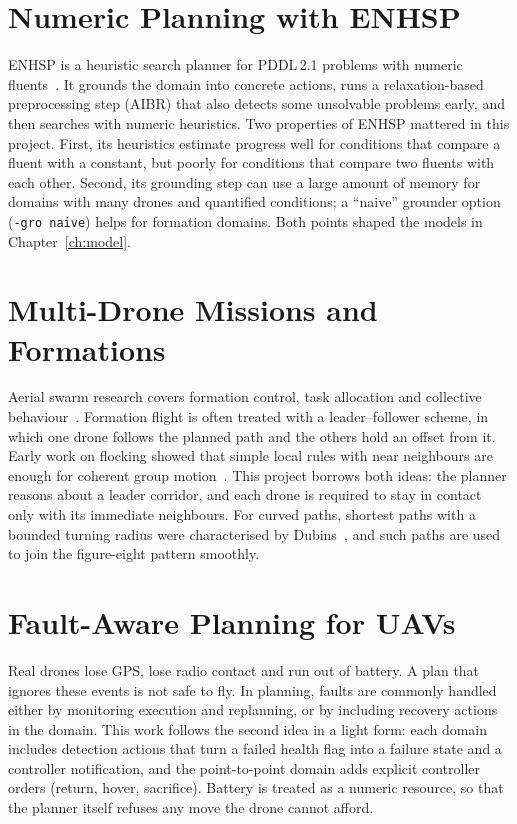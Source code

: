 \documentclass[11pt,a4paper,oneside]{report}
\newcommand{\code}[1]{\texttt{#1}}
\begin{document}
\section{Numeric Planning with ENHSP}
ENHSP is a heuristic search planner for PDDL\,2.1 problems with numeric
fluents~\cite{scala2016interval,scala2020subgoaling}. It grounds the domain into concrete actions,
runs a relaxation-based preprocessing step (AIBR) that also detects some unsolvable problems
early, and then searches with numeric heuristics. Two properties of ENHSP mattered in this
project. First, its heuristics estimate progress well for conditions that compare a fluent with
a constant, but poorly for conditions that compare two fluents with each other. Second, its
grounding step can use a large amount of memory for domains with many drones and quantified
conditions; a ``naive'' grounder option (\code{-gro naive}) helps for formation domains. Both
points shaped the models in Chapter~\ref{ch:model}.

\section{Multi-Drone Missions and Formations}
Aerial swarm research covers formation control, task allocation and collective
behaviour~\cite{chung2018survey,brambilla2013swarm}. Formation flight is often treated with a
leader--follower scheme, in which one drone follows the planned path and the others hold an
offset from it. Early work on flocking showed that simple local rules with near neighbours are
enough for coherent group motion~\cite{reynolds1987flocks}. This project borrows both ideas: the
planner reasons about a leader corridor, and each drone is required to stay in contact only with
its immediate neighbours. For curved paths, shortest paths with a bounded turning radius were
characterised by Dubins~\cite{dubins1957curves}, and such paths are used to join the figure-eight
pattern smoothly.

\section{Fault-Aware Planning for UAVs}
Real drones lose GPS, lose radio contact and run out of battery. A plan that ignores these events
is not safe to fly. In planning, faults are commonly handled either by monitoring execution and
replanning, or by including recovery actions in the domain. This work follows the second idea in
a light form: each domain includes detection actions that turn a failed health flag into a failure
state and a controller notification, and the point-to-point domain adds explicit controller
orders (return, hover, sacrifice). Battery is treated as a numeric resource, so that the planner
itself refuses any move the drone cannot afford.
\end{document}
